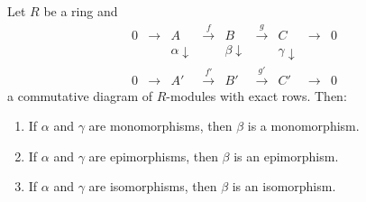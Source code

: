 Let $R$ be a ring and
\[
\begin{array}{ccccccccc}
0 & \to & A & \xrightarrow{f} & B & \xrightarrow{g} & C & \to & 0 \\
& & \alpha \downarrow & & \beta \downarrow & & \gamma \downarrow & & \\
0 & \to & A' & \xrightarrow{f'} & B' & \xrightarrow{g'} & C' & \to & 0
\end{array}
\]
a commutative diagram of $R$-modules with exact rows. Then:
\begin{enumerate}
\item[(i)] If $\alpha$ and $\gamma$ are monomorphisms, then $\beta$ is a monomorphism.
\item[(ii)] If $\alpha$ and $\gamma$ are epimorphisms, then $\beta$ is an epimorphism.
\item[(iii)] If $\alpha$ and $\gamma$ are isomorphisms, then $\beta$ is an isomorphism.
\end{enumerate}
